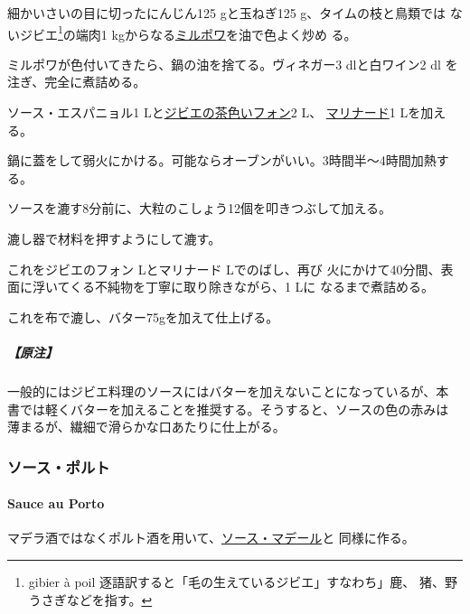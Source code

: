\begin{recette}
細かいさいの目に切ったにんじん125 gと玉ねぎ125 g、タイムの枝と鳥類では
ないジビエ\footnote{gibier à poil
  逐語訳すると「毛の生えているジビエ」すなわち」鹿、
  猪、野うさぎなどを指す。}の端肉1
kgからなる\protect\hyperlink{mirepoix}{ミルポワ}を油で色よく炒め る。

ミルポワが色付いてきたら、鍋の油を捨てる。ヴィネガー3 dlと白ワイン2 dl
を注ぎ、完全に煮詰める。

ソース・エスパニョル1
Lと\protect\hyperlink{fonds-de-gibier}{ジビエの茶色いフォン}2 L、
\protect\hyperlink{}{マリナード}1 Lを加える。

鍋に蓋をして弱火にかける。可能ならオーブンがいい。3時間半〜4時間加熱す
る。

ソースを漉す8分前に、大粒のこしょう12個を叩きつぶして加える。

漉し器で材料を押すようにして漉す。

これをジビエのフォン\unquart{} Lとマリナード\unquart{} Lでのばし、再び
火にかけて40分間、表面に浮いてくる不純物を丁寧に取り除きながら、1 Lに
なるまで煮詰める。

これを布で漉し、バター75gを加えて仕上げる。

\hypertarget{ux539fux6ce8-6}{%
\subparagraph{【原注】}\label{ux539fux6ce8-6}}

一般的にはジビエ料理のソースにはバターを加えないことになっているが、本
書では軽くバターを加えることを推奨する。そうすると、ソースの色の赤みは
薄まるが、繊細で滑らかな口あたりに仕上がる。

\maeaki

\hypertarget{ux30bdux30fcux30b9ux30ddux30ebux30c8}{%
\subsubsection{ソース・ポルト}\label{ux30bdux30fcux30b9ux30ddux30ebux30c8}}

\hypertarget{sauce-au-porto}{%
\paragraph{Sauce au Porto}\label{sauce-au-porto}}


マデラ酒ではなくポルト酒を用いて、\protect\hyperlink{sauce-madere}{ソース・マデール}と
同様に作る。


\end{recette}
